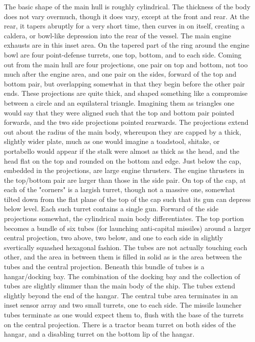 The basic shape of the main hull is roughly cylindrical. The thickness
of the body does not vary overmuch, though it does vary, except at the
front and rear. At the rear, it tapers abruptly for a very short time,
then curves in on itself, creating a caldera, or bowl-like depression
into the rear of the vessel.  The main engine exhausts are in this
inset area.  On the tapered part of the ring around the engine bowl
are four point-defense turrets, one top, bottom, and to each
side. Coming out from the main hull are four projections, one pair on
top and bottom, not too much after the engine area, and one pair on
the sides, forward of the top and bottom pair, but overlapping
somewhat in that they begin before the other pair ends. These
projections are quite thick, and shaped something like a compromise
between a circle and an equilateral triangle.  Imagining them as
triangles one would say that they were aligned such that the top and
bottom pair pointed forwards, and the two side projections pointed
rearwards.  The projections extend out about the radius of the main
body, whereupon they are capped by a thick, slightly wider plate, much
as one would imagine a toadstool, shitake, or portabello would appear
if the stalk were almost as thick as the head, and the head flat on
the top and rounded on the bottom and edge.  Just below the cap,
embedded in the projections, are large engine thrusters. The engine
thrusters in the top/bottom pair are larger than those in the side
pair.  On top of the cap, at each of the "corners" is a largish
turret, though not a massive one, somewhat tilted down from the flat
plane of the top of the cap such that its gun can depress below
level. Each such turret contains a single gun.  Forward of the side
projections somewhat, the cylindrical main body differentiates.  The
top portion becomes a bundle of six tubes (for launching anti-capital
missiles) around a larger central projection, two above, two below,
and one to each side in slightly svertically squashed hexagonal
fashion.  The tubes are not actually touching each other, and the area
in between them is filled in solid as is the area between the tubes
and the central projection. Beneath this bundle of tubes is a
hangar/docking bay. The combination of the docking bay and the
collection of tubes are slightly slimmer than the main body of the
ship. The tubes extend slightly beyond the end of the hangar.  The
central tube area terminates in an inset sensor array and two small
turrets, one to each side.  The missile launcher tubes terminate as
one would expect them to, flush with the base of the turrets on the
central projection. There is a tractor beam turret on both sides of
the hangar, and a disabling turret on the bottom lip of the hangar.

